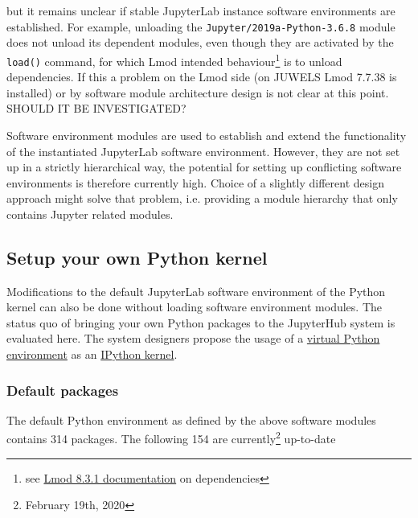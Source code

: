 \documentclass[11pt,a4paper]{article}
\begin{document}
but it remains unclear if stable JupyterLab instance software environments are established.
For example, unloading the \verb|Jupyter/2019a-Python-3.6.8| module does not unload its dependent modules, even though they are activated by the \verb|load()| command, for which Lmod intended behaviour\footnote{see \href{https://lmod.readthedocs.io/en/latest/098_dependent_modules.html}{Lmod 8.3.1 documentation} on dependencies} is to unload dependencies.
If this a problem on the Lmod side (on JUWELS Lmod 7.7.38 is installed) or by software module architecture design is not clear at this point.
SHOULD IT BE INVESTIGATED?

Software environment modules are used to establish and extend the functionality of the instantiated JupyterLab software environment.
However, they are not set up in a strictly hierarchical way, the potential for setting up conflicting software environments is therefore currently high.
Choice of a slightly different design approach might solve that problem, i.e. providing a module hierarchy that only contains Jupyter related modules.

\subsection{Setup your own Python kernel}

Modifications to the default JupyterLab software environment of the Python kernel can also be done without loading  software environment modules.
The status quo of bringing your own Python packages to the JupyterHub system is evaluated here.
The system designers propose the usage of a \href{https://docs.python.org/3/library/venv.html}{virtual Python environment} as an \href{https://ipython.org/ipython-doc/3/development/kernels.html#kernelspecs}{IPython kernel}.

\subsubsection{Default packages}
\label{sect:python-kernel:default-packages}

The default Python environment as defined by the above software modules contains 314 packages.
The following 154 are currently\footnote{February 19th, 2020} up-to-date
\end{document}
